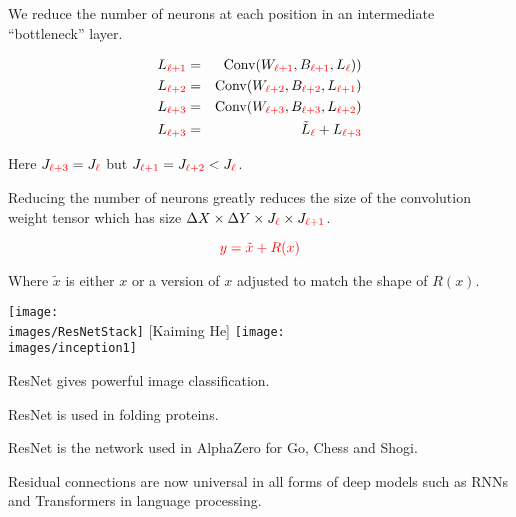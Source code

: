 {
We reduce the number of neurons at each position in an intermediate ``bottleneck'' layer.

\begin{eqnarray*}
L_{\color{red} \ell+1} & = & \mathrm{Conv}(W_{\color{red} \ell+1},B_{\color{red} \ell+1},L_{\color{red} \ell})) \\
L_{\color{red} \ell+2} & = & \mathrm{Conv}(W_{\color{red} \ell+2},B_{\color{red} \ell+2},L_{\color{red} \ell+1}) \\
L_{\color{red} \ell+3} & = & \mathrm{Conv}(W_{\color{red} \ell+3},B_{\color{red} \ell+3},L_{\color{red} \ell+2}) \\
L_{\color{red} \ell+3} & = & \tilde{L}_{\color{red} \ell} + L_{\color{red} \ell+3}
\end{eqnarray*}

\vfill
Here $J_{\color{red} \ell+3} = J_{\color{red} \ell}$ but $J_{\color{red} \ell+1} = J_{\color{red} \ell+2} < J_{\color{red} \ell}$.

\vfill
Reducing the number of neurons greatly reduces the size of the convolution weight tensor which has size $\Delta X \times \Delta Y \times J_{\color{red} \ell} \times J_{\color{red} \ell+1}$.


$${\color{red} y = \tilde{x} + R(x)}$$

\vfill
Where $\tilde{x}$ is either $x$ or a version of $x$ adjusted to match the shape of $R(x)$.



\centerline{\texttt{[image: \\images/ResNetStack]} {\large [Kaiming He]} \texttt{[image: \\images/inception1]}}


ResNet gives powerful image classification.

\vfill
ResNet is used in folding proteins.

\vfill
ResNet is the network used in AlphaZero for Go, Chess and Shogi.

\vfill
Residual connections are now universal in all forms of deep models such as RNNs and Transformers in language processing.


}

